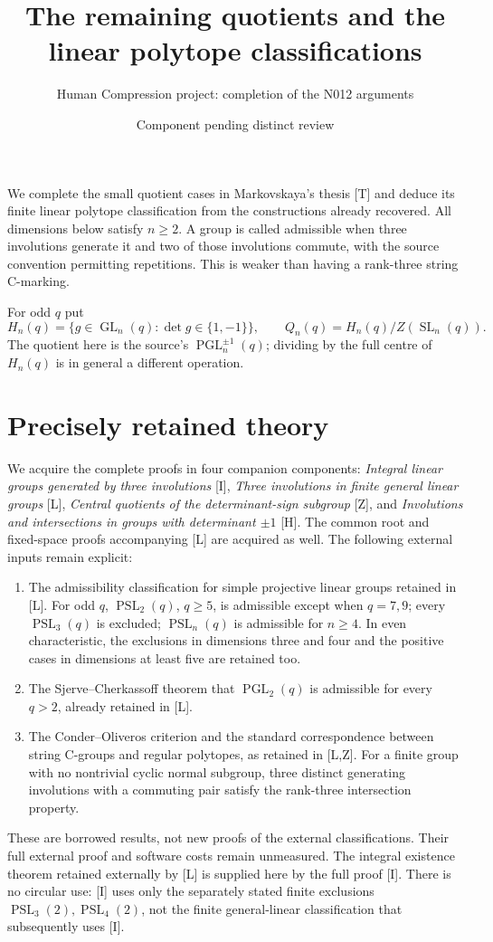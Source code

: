 \documentclass[11pt,a4paper]{article}
\title{The remaining quotients and the linear polytope classifications}
\author{Human Compression project: completion of the N012 arguments}
\date{Component pending distinct review}
\newcommand{\GL}{\operatorname{GL}}
\newcommand{\SL}{\operatorname{SL}}
\newcommand{\PGL}{\operatorname{PGL}}
\newcommand{\PSL}{\operatorname{PSL}}
\begin{document}
\maketitle
We complete the small quotient cases in Markovskaya's thesis [T] and
deduce its finite linear polytope classification from the constructions
already recovered. All dimensions below satisfy $n\ge2$. A group is
called admissible when three involutions generate it and two of those
involutions commute, with the source convention permitting repetitions.
This is weaker than having a rank-three string C-marking.

For odd $q$ put
\[
 H_n(q)=\{g\in\GL_n(q):\det g\in\{1,-1\}\},\qquad
 Q_n(q)=H_n(q)/Z(\SL_n(q)).
\]
The quotient here is the source's $\PGL_n^{\pm1}(q)$; dividing by
the full centre of $H_n(q)$ is in general a different operation.

\section{Precisely retained theory}
We acquire the complete proofs in four companion components:
\emph{Integral linear groups generated by three involutions} [I],
\emph{Three involutions in finite general linear groups} [L],
\emph{Central quotients of the determinant-sign subgroup} [Z], and
\emph{Involutions and intersections in groups with determinant
$\pm1$} [H]. The common root and fixed-space proofs accompanying [L]
are acquired as well. The following external inputs remain explicit:
\begin{enumerate}
\item The admissibility classification for simple projective linear
groups retained in [L]. For odd $q$, $\PSL_2(q)$, $q\ge5$, is
admissible except when $q=7,9$; every $\PSL_3(q)$ is excluded;
$\PSL_n(q)$ is admissible for $n\ge4$. In even characteristic,
the exclusions in dimensions three and four and the positive cases
in dimensions at least five are retained too.
\item The Sjerve--Cherkassoff theorem that $\PGL_2(q)$ is admissible
for every $q>2$, already retained in [L].
\item The Conder--Oliveros criterion and the standard correspondence
between string C-groups and regular polytopes, as retained in [L,Z].
For a finite group with no nontrivial cyclic normal subgroup, three
distinct generating involutions with a commuting pair satisfy the
rank-three intersection property.
\end{enumerate}
These are borrowed results, not new proofs of the external
classifications. Their full external proof and software costs remain
unmeasured. The integral existence theorem retained externally by [L]
is supplied here by the full proof [I]. There is no circular use:
[I] uses only the separately stated finite exclusions
$\PSL_3(2),\PSL_4(2)$, not the finite general-linear classification
that subsequently uses [I].
\end{document}
